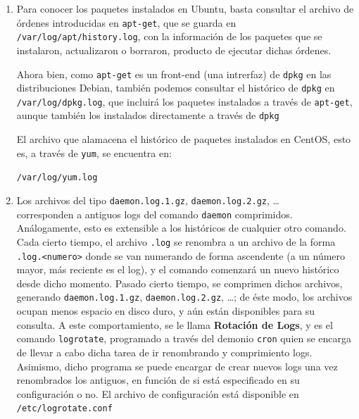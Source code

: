 \documentclass[a4paper,10pt]{article}
\newenvironment{answer}{%
\begin{list}{}{%
}%
\item[]}{\end{list}}
\begin{document}
\begin{answer}
 \begin{enumerate}[label=\alph*.] %
  \item Para conocer los paquetes instalados en Ubuntu, basta consultar el archivo de órdenes introducidas en \texttt{apt-get},
  que se guarda en \texttt{/var/log/apt/history.log}, con la información
  de los paquetes que se instalaron, actualizaron o borraron, producto de ejecutar dichas órdenes.
  
  Ahora bien, como \texttt{apt-get} es un front-end (una intrerfaz) de \texttt{dpkg} en las distribuciones Debian, también
  podemos consultar el histórico de \texttt{dpkg} en \texttt{/var/log/dpkg.log}, que incluirá los paquetes instalados a través
  de \texttt{apt-get}, aunque también los instalados directamente a través de \texttt{dpkg}
  \cite{apt}
  
  El archivo que alamacena el histórico de paquetes instalados en CentOS, esto es, a través de \texttt{yum}, se encuentra en:
  \begin{center}\texttt{/var/log/yum.log}\end{center}
  \cite{yum}
  
  \item Los archivos del tipo \texttt{daemon.log.1.gz}, \texttt{daemon.log.2.gz}, \ldots\\ corresponden a antiguos logs del comando
  \texttt{daemon} comprimidos. Análogamente, esto es extensible a los históricos de cualquier otro comando. Cada cierto tiempo, el archivo
  \texttt{.log} se renombra a un archivo de la forma \texttt{.log.<numero>} donde se van numerando de forma ascendente (a un número
  mayor, más reciente es el log), y el comando comenzará un nuevo histórico desde dicho momento. Pasado cierto tiempo, se comprimen dichos archivos, generando  \texttt{daemon.log.1.gz}, \texttt{daemon.log.2.gz}, \ldots; 
  de éste modo, los archivos ocupan menos espacio en disco duro, y aún están disponibles para su consulta.
  A este comportamiento, se le llama \textbf{Rotación de Logs}, y es el comando \texttt{logrotate}, programado a través del demonio
  \texttt{cron} quien se encarga de llevar a cabo dicha tarea de ir renombrando y comprimiento logs. Asimismo, dicho programa
  se puede encargar de crear nuevos logs una vez renombrados los antiguos, en función de si está especificado en su configuración
  o no. El archivo de configuración está disponible en \texttt{/etc/logrotate.conf}
  \cite{logs}
 \end{enumerate}

\end{answer}
\end{document}
